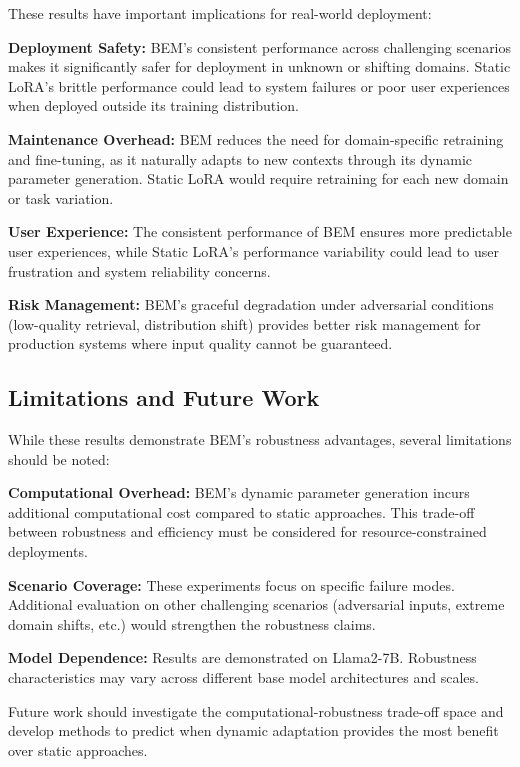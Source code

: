 These results have important implications for real-world deployment:

\textbf{Deployment Safety:} BEM's consistent performance across challenging scenarios makes it significantly safer for deployment in unknown or shifting domains. Static LoRA's brittle performance could lead to system failures or poor user experiences when deployed outside its training distribution.

\textbf{Maintenance Overhead:} BEM reduces the need for domain-specific retraining and fine-tuning, as it naturally adapts to new contexts through its dynamic parameter generation. Static LoRA would require retraining for each new domain or task variation.

\textbf{User Experience:} The consistent performance of BEM ensures more predictable user experiences, while Static LoRA's performance variability could lead to user frustration and system reliability concerns.

\textbf{Risk Management:} BEM's graceful degradation under adversarial conditions (low-quality retrieval, distribution shift) provides better risk management for production systems where input quality cannot be guaranteed.

\subsection{Limitations and Future Work}

While these results demonstrate BEM's robustness advantages, several limitations should be noted:

\textbf{Computational Overhead:} BEM's dynamic parameter generation incurs additional computational cost compared to static approaches. This trade-off between robustness and efficiency must be considered for resource-constrained deployments.

\textbf{Scenario Coverage:} These experiments focus on specific failure modes. Additional evaluation on other challenging scenarios (adversarial inputs, extreme domain shifts, etc.) would strengthen the robustness claims.

\textbf{Model Dependence:} Results are demonstrated on Llama2-7B. Robustness characteristics may vary across different base model architectures and scales.

Future work should investigate the computational-robustness trade-off space and develop methods to predict when dynamic adaptation provides the most benefit over static approaches.